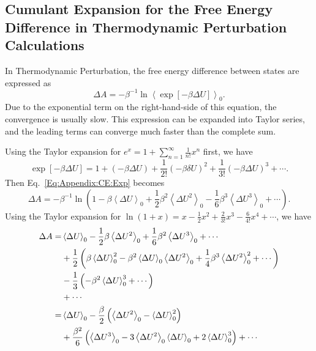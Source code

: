 \begin{appendices}
\chapter{Cumulant Expansion for the Free Energy Difference in Thermodynamic Perturbation Calculations\label{chapter:Appendix:CE}}
In Thermodynamic Perturbation, the free energy difference between states are expressed as
\begin{equation}
	\Delta A=-\beta^{-1}\ln{\left<\exp{\left[-\beta \Delta U\right]}\right>}_0.
	\label{Eq:Appendix:CE:Exp}
\end{equation}
Due to the exponential term on the right-hand-side of this equation, the convergence is usually slow. This expression can be expanded into Taylor series, and the leading terms can converge much faster than the complete sum.

Using the Taylor expansion for $e^x=1+\sum\limits_{n=1}^{\infty}\frac{1}{n!}x^n$ first, we have
\begin{equation}
	\exp{\left[-\beta \Delta U\right]}=1+(-\beta \Delta U)+\frac{1}{2!}(-\beta \delta U)^2+\frac{1}{3!}(-\beta \Delta U)^3+\cdots.
\end{equation}
Then Eq.~\ref{Eq:Appendix:CE:Exp} becomes
\begin{equation}
	\Delta A=-\beta^{-1}\ln{\left(1-\beta\left<\Delta U\right>_0+\frac{1}{2}\beta^2\left<\Delta U^2\right>_0-\frac{1}{6}\beta^3\left<\Delta U^3\right>_0+\cdots\right)}.
\end{equation}
Using the Taylor expansion for $\ln{(1+x)}=x-\frac{1}{2}x^2+\frac{2}{3!}x^3-\frac{6}{4!}x^4+\cdots$, we have
\begin{align}
	\Delta A=&\left<\Delta U\right>_0-\frac{1}{2}\beta\left<\Delta U^2\right>_0+\frac{1}{6}\beta^2\left<\Delta U^3\right>_0+\cdots\notag\\
	         &+\frac{1}{2}\left(\beta\left<\Delta U\right>_0^2-\beta^2\left<\Delta U\right>_0\left<\Delta U^2\right>_0+\frac{1}{4}\beta^3\left<\Delta U^2\right>_0^2+\cdots\right)\notag\\
	         &-\frac{1}{3}\left(-\beta^2\left<\Delta U\right>_0^3+\cdots\right)\notag\\
	         &+\cdots\notag\\
	        =&\left<\Delta U\right>_0-\frac{\beta}{2}\left(\left<\Delta U^2\right>_0-\left<\Delta U\right>_0^2\right)\notag\\
	         &+\frac{\beta^2}{6}\left(\left<\Delta U^3\right>_0-3\left<\Delta U^2\right>_0\left<\Delta U\right>_0+2\left<\Delta U\right>_0^3\right)+\cdots
\end{align}



\end{appendices}
